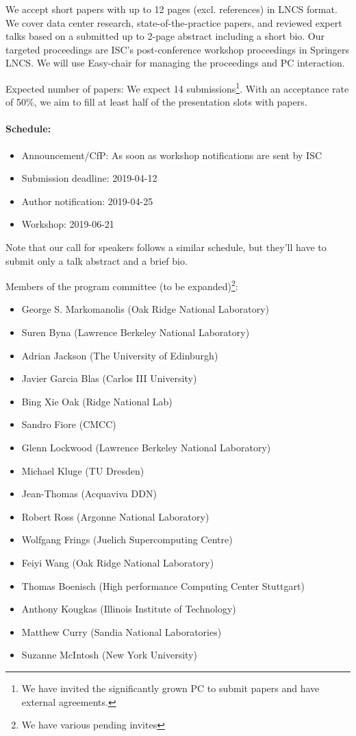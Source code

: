 \documentclass[a4paper,10pt]{article}
\begin{document}
We accept short papers with up to 12 pages (excl. references) in LNCS format.
We cover data center research, state-of-the-practice papers, and reviewed expert talks based on a submitted up to 2-page abstract including a short bio.
Our targeted proceedings are ISC's post-conference workshop proceedings in Springers LNCS.
We will use Easy-chair for managing the proceedings and PC interaction.

Expected number of papers: We expect 14 submissions\footnote{We have invited the significantly grown PC to submit papers and have external agreements.}.
With an acceptance rate of 50\%, we aim to fill at least half of the presentation slots with papers.

\paragraph{Schedule:}
\begin{itemize}
  \item Announcement/CfP: As soon as workshop notifications are sent by ISC
  \item Submission deadline: 2019-04-12
  \item Author notification: 2019-04-25
  \item Workshop: 2019-06-21
\end{itemize}
Note that our call for speakers follows a similar schedule, but they'll have to submit only a talk abstract and a brief bio.

Members of the program committee (to be expanded)\footnote{We have various pending invites}:
\begin{itemize}
  \item George S.	Markomanolis	(Oak Ridge National Laboratory)
  \item Suren	Byna	(Lawrence Berkeley National Laboratory)
  \item Adrian	Jackson	(The University of Edinburgh)
  \item Javier	Garcia Blas	(Carlos III University)
  \item Bing	Xie	Oak (Ridge National Lab)
  \item Sandro	Fiore	(CMCC)
  \item Glenn	Lockwood	(Lawrence Berkeley National Laboratory)
  \item Michael	Kluge	(TU Dresden)
  \item Jean-Thomas	(Acquaviva	DDN)
  \item Robert	Ross	(Argonne National Laboratory)
  \item Wolfgang	Frings	(Juelich Supercomputing Centre)
  \item Feiyi	Wang	(Oak Ridge National Laboratory)
  \item Thomas	Boenisch	(High performance Computing Center Stuttgart)
  \item Anthony	Kougkas	(Illinois Institute of Technology)
  \item Matthew	Curry	(Sandia National Laboratories)
  \item Suzanne	McIntosh	(New York University)
\end{itemize}
\end{document}
